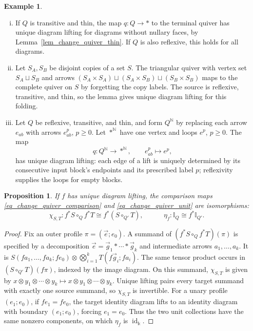 \documentclass[11pt,letterpaper]{article}
\numberwithin{equation}{section}
\theoremstyle{plain}
\newtheorem{prop}[thm]{Proposition}
\theoremstyle{definition}
\newtheorem{ex}[thm]{Example}
\theoremstyle{remark}
\newcommand{\id}{\operatorname{id}}
\begin{document}
\begin{ex}\label{ex_change_quiver_terminal_folding}
\begin{enumerate}[(i)]
\item If $Q$ is transitive and thin, the map $q:Q\to\ast$ to the
terminal quiver has unique diagram lifting for diagrams without
nullary faces, by Lemma~\ref{lem_change_quiver_thin}. If $Q$ is also
reflexive, this holds for all diagrams.
\item Let $S_A,S_B$ be disjoint copies of a set $S$. The triangular
quiver with vertex set $S_A\sqcup S_B$ and arrows
$ (S_A\times S_A)\sqcup(S_A\times S_B)\sqcup(S_B\times S_B)$
maps to the complete quiver on $S$ by forgetting the copy labels.
The source is reflexive, transitive, and thin, so the lemma gives
unique diagram lifting for this folding.
\item Let $Q$ be reflexive, transitive, and thin, and form $Q^{\mathbb N}$ by
replacing each arrow $e_{ab}$ with arrows $e^p_{ab}$, $p\geq0$.
Let $\ast^{\mathbb N}$ have one vertex and loops $e^p$, $p\geq0$.
The map
\[
 q:Q^{\mathbb N}\longrightarrow\ast^{\mathbb N},
 \qquad e^p_{ab}\longmapsto e^p,
\]
has unique diagram lifting: each edge of a lift is uniquely determined
by its consecutive input block's endpoints and its prescribed label $p$;
reflexivity supplies the loops for empty blocks.
\end{enumerate}
\end{ex}


\begin{prop}\label{prop_change_quiver_strong_monoidal}
If $f$ has unique diagram lifting, the comparison maps
\eqref{eq_change_quiver_comparison} and
\eqref{eq_change_quiver_unit} are isomorphisms:
\begin{equation}\label{eq_change_quiver_strong_monoidal}
 \chi_{S,T}: f^*S\circ_Q f^*T\cong f^*(S\circ_{Q'}T),
 \qquad \quad \eta_f: \mathbb I_Q\cong f^*\mathbb I_{Q'}.
\end{equation}
\end{prop}
\begin{proof}
Fix an outer profile $\pi=(\vec e;e_0)$. A summand of
$(f^*S\circ_Q f^*T)(\pi)$ is specified by a decomposition
$\vec e=\vec g_1*\cdots*\vec g_k$ and intermediate arrows
$a_1,\ldots,a_k$. It is
$ S(fa_1,\ldots,fa_k;fe_0)
 \otimes\bigotimes_{i=1}^k T(f\vec g_i;fa_i)$.
The same tensor product occurs in $(S\circ_{Q'}T)(f\pi)$,
indexed by the image diagram.
On this summand,
$ \chi_{S,T}$ is given by $x\otimes y_1\otimes\cdots\otimes y_k
\mapsto x\otimes y_1\otimes\cdots\otimes y_k$.
Unique lifting pairs every target summand with exactly one source
summand, so $\chi_{S,T}$ is invertible.
For a unary profile $(e_1;e_0)$, if $fe_1=fe_0$, the target identity
diagram lifts to an identity diagram with boundary $(e_1;e_0)$,
forcing $e_1=e_0$. Thus the two unit collections have the same
nonzero components, on which $\eta_f$ is $\id_{\Bbbk}$.
\end{proof}
\end{document}
